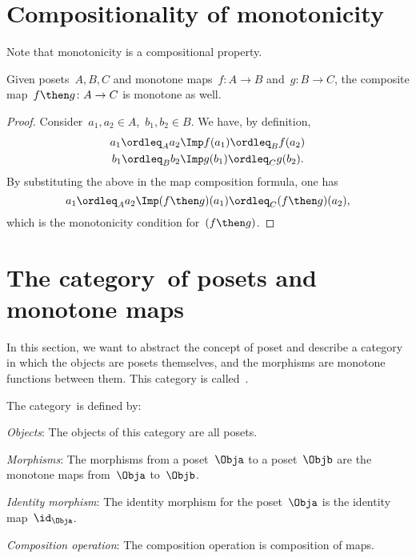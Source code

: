 \section{Compositionality of monotonicity}
Note that monotonicity is a compositional property.
\begin{lemma}
Given  posets~$A, B, C$ and monotone maps~$f\colon A \to B$ and~$g\colon B \to C$, the composite map~$f\then g\colon  A \to C$ is
monotone as well.
\end{lemma}
\begin{proof}
Consider~$a_1,a_2 \in A$,~$b_1,b_2\in B$. We have, by definition,
\begin{equation}
\begin{aligned}
        a_1\ordleq_A a_2 &\Imp f(a_1)\ordleq_B f(a_2)\\
        b_1\ordleq_B b_2 &\Imp g(b_1)\ordleq_C g(b_2).
\end{aligned}
\end{equation}
By substituting the above in the map composition formula, one has
\begin{equation}
    a_1\ordleq_A a_2 \Imp (f\then g)(a_1) \ordleq_C (f\then g)(a_2),
\end{equation}
which is the monotonicity condition for~$(f\then g)$.
\end{proof}

\section{The category~\Pos of posets and monotone maps}
In this section, we want to abstract the concept of poset and describe a category in which the objects are posets themselves, and the morphisms are monotone functions between them. This category is called~\Pos.

\begin{definition}
    The category~\Pos is defined by:
    \begin{compactenum}
    \item \emph{Objects}: The objects of this category are all posets.
    \item \emph{Morphisms}: The morphisms from a poset~$\Obja$ to a poset~$\Objb$ are the monotone maps from~$\Obja$ to~$\Objb$.
    \item \emph{Identity morphism}:  The identity morphism for the poset~$\Obja$
    is the identity map~$\id_\Obja$.
    \item \emph{Composition operation}: The composition operation is composition of maps.
    \end{compactenum}
\end{definition}

